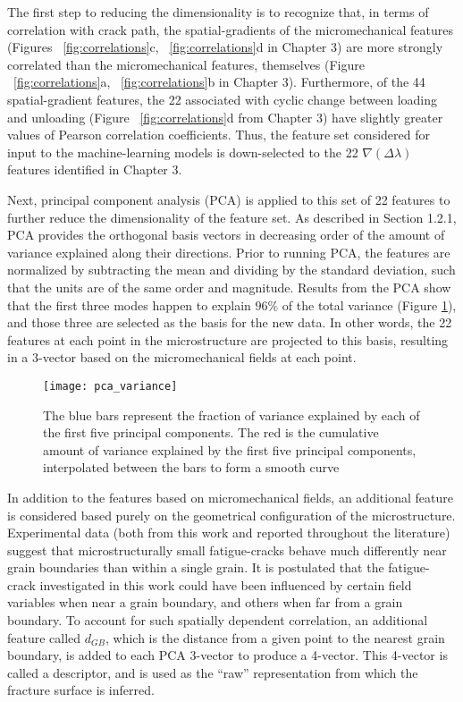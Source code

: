 The first step to reducing the dimensionality is to recognize that, in terms of correlation with crack path, the spatial-gradients of the micromechanical features (Figures ~\ref{fig:correlations}c, ~\ref{fig:correlations}d in Chapter 3) are more strongly correlated than the micromechanical features, themselves (Figure ~\ref{fig:correlations}a, ~\ref{fig:correlations}b in Chapter 3).  Furthermore, of the 44 spatial-gradient features, the 22 associated with cyclic change between loading and unloading (Figure ~\ref{fig:correlations}d from Chapter 3) have slightly greater values of Pearson correlation coefficients. Thus, the feature set considered for input to the machine-learning models is down-selected to the 22 $\nabla (\Delta \lambda)$ features identified in Chapter 3.

Next, principal component analysis (PCA) is applied to this set of 22 features to further reduce the dimensionality of the feature set.  As described in Section 1.2.1, PCA provides the orthogonal basis vectors in decreasing order of the amount of variance explained along their directions.  Prior to running PCA, the features are normalized by subtracting the mean and dividing by the standard deviation, such that the units are of the same order and magnitude.  Results from the PCA show that the first three modes happen to explain $96\%$ of the total variance (Figure \ref{fig:pca_variance}), and those three are selected as the basis for the new data.  In other words, the 22 features at each point in the microstructure are projected to this basis, resulting in a 3-vector based on the micromechanical fields at each point.

\begin{figure}[t]
  \centering
    \texttt{[image: pca\_variance]}
    \caption{The blue bars represent the fraction of variance explained by each of the first five principal components. The red is the cumulative amount of variance explained by the first five principal components, interpolated between the bars to form a smooth curve}
  \label{fig:pca_variance}
\end{figure}

In addition to the features based on micromechanical fields, an additional feature is considered based purely on the geometrical configuration of the microstructure.  Experimental data (both from this work and reported throughout the literature) suggest that microstructurally small fatigue-cracks behave much differently near grain boundaries than within a single grain.  It is postulated that the fatigue-crack investigated in this work could have been influenced by certain field variables when near a grain boundary, and others when far from a grain boundary.  To account for such spatially dependent correlation, an additional feature called $d_{GB}$, which is the distance from a given point to the nearest grain boundary, is added to each PCA 3-vector to produce a 4-vector.  This 4-vector is called a descriptor, and is used as the ``raw'' representation from which the fracture surface is inferred.


